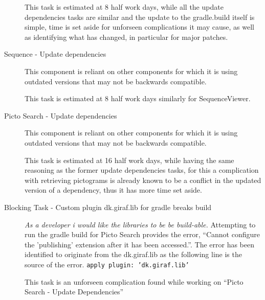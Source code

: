 \begin{description}
        This task is estimated at 8 half work days, while all the update dependencies tasks are similar and the update to the gradle.build itself is simple, time is set aside for unforseen complications it may cause, as well as identifying what has changed, in particular for major patches.
    \item[Sequence - Update dependencies]
        This component is reliant on other components for which it is using outdated versions that may not be backwards compatible.

        This task is estimated at 8 half work days similarly for SequenceViewer.
    \item[Picto Search - Update dependencies] 
        This component is reliant on other components for which it is using outdated versions that may not be backwards compatible.

        This task is estimated at 16 half work days, while having the same reasoning as the former update dependencies tasks, for this a complication with retrieving pictograms is already known to be a conflict in the updated version of a dependency, thus it has more time set aside.
    \item[Blocking Task - Custom plugin dk.giraf.lib for gradle breaks build]
        \textit{As a developer i would like the libraries to be be build-able.}
        Attempting to run the gradle build for Picto Search provides the error, ``Cannot configure the 'publishing' extension after it has been accessed.''. The error has been identified to originate from the dk.giraf.lib as the following line is the source of the error.
        \texttt{apply plugin: 'dk.giraf.lib'}

        This task is an unforseen complication found while working on ``Picto Search - Update Dependencies''
\end{description}
